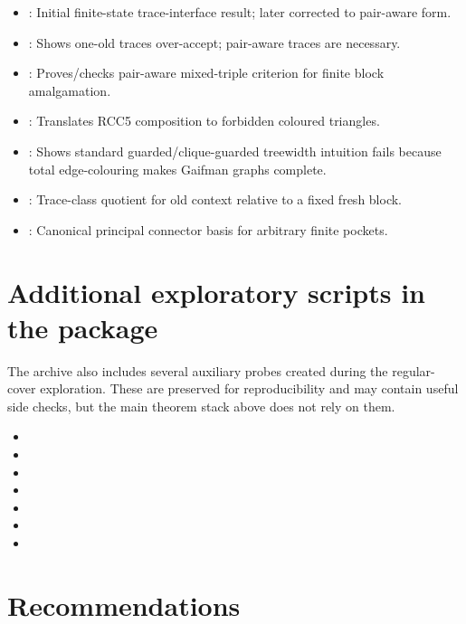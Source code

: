 \documentclass[11pt]{article}
\begin{document}
\begin{itemize}
\item {}: Initial finite-state trace-interface result; later corrected to pair-aware form.
\item {}: Shows one-old traces over-accept; pair-aware traces are necessary.
\item {}: Proves/checks pair-aware mixed-triple criterion for finite block amalgamation.
\item {}: Translates RCC5 composition to forbidden coloured triangles.
\item {}: Shows standard guarded/clique-guarded treewidth intuition fails because total edge-colouring makes Gaifman graphs complete.
\item {}: Trace-class quotient for old context relative to a fixed fresh block.
\item {}: Canonical principal connector basis for arbitrary finite pockets.
\normalsize
\end{itemize}


\section{Additional exploratory scripts in the package}
The archive also includes several auxiliary probes created during the regular-cover exploration.  These are preserved for reproducibility and may contain useful side checks, but the main theorem stack above does not rely on them.
\begin{itemize}
\small
\item {}
\item {}
\item {}
\item {}
\item {}
\item {}
\item {}
\normalsize
\end{itemize}

\section{Recommendations}
\end{document}
